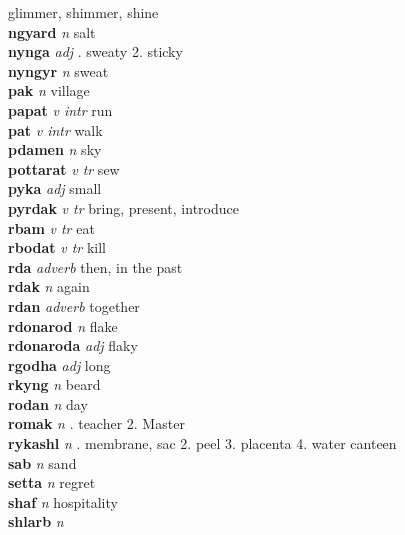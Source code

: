 glimmer, shimmer, shine\\\textbf{ngyard}   \emph{n} \textperiodcentered salt\\\textbf{nynga}   \emph{adj} . sweaty 2. sticky \\\textbf{nyngyr}   \emph{n} \textperiodcentered sweat\\\textbf{pak}   \emph{n} \textperiodcentered village\\\textbf{papat}   \emph{v intr} \textperiodcentered run\\\textbf{pat}   \emph{v intr} \textperiodcentered walk\\\textbf{pdamen}   \emph{n} \textperiodcentered sky\\\textbf{pottarat}   \emph{v tr} \textperiodcentered sew\\\textbf{pyka}   \emph{adj} \textperiodcentered small\\\textbf{pyrdak}   \emph{v tr} \textperiodcentered bring, present, introduce\\\textbf{rbam}   \emph{v tr} \textperiodcentered eat\\\textbf{rbodat}   \emph{v tr} \textperiodcentered kill\\\textbf{rda}   \emph{adverb} \textperiodcentered then, in the past\\\textbf{rdak}   \emph{n} \textperiodcentered again\\\textbf{rdan}   \emph{adverb} \textperiodcentered together\\\textbf{rdonarod}   \emph{n} \textperiodcentered flake\\\textbf{rdonaroda}   \emph{adj} \textperiodcentered flaky\\\textbf{rgodha}   \emph{adj} \textperiodcentered long\\\textbf{rkyng}   \emph{n} \textperiodcentered beard\\\textbf{rodan}   \emph{n} \textperiodcentered day\\\textbf{romak}   \emph{n} . teacher 2. Master \\\textbf{rykashl}   \emph{n} . membrane, sac 2. peel 3. placenta 4. water canteen \\\textbf{sab}   \emph{n} \textperiodcentered sand\\\textbf{setta}   \emph{n} \textperiodcentered regret\\\textbf{shaf}   \emph{n} \textperiodcentered hospitality\\\textbf{shlarb}   \emph{n} \textperiodcentered 